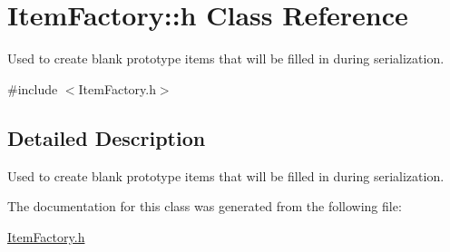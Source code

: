 \hypertarget{class_item_factory_1_1h}{}\section{Item\+Factory\+:\+:h Class Reference}
\label{class_item_factory_1_1h}


Used to create blank prototype items that will be filled in during serialization.  




{\ttfamily \#include $<$Item\+Factory.\+h$>$}



\subsection{Detailed Description}
Used to create blank prototype items that will be filled in during serialization. 

The documentation for this class was generated from the following file\+:\begin{DoxyCompactItemize}
\item 
\hyperlink{_item_factory_8h}{Item\+Factory.\+h}\end{DoxyCompactItemize}
